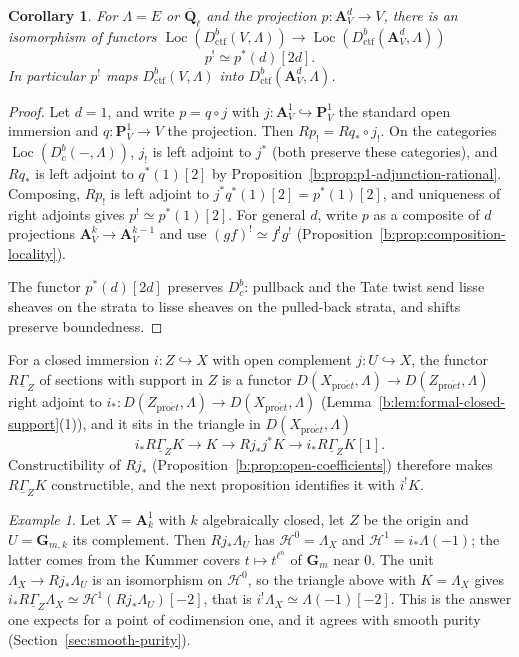 \documentclass[11pt,a4paper]{article}
\numberwithin{equation}{section}
\newtheorem{corollary}[theorem]{Corollary}
\theoremstyle{definition}
\theoremstyle{remark}
\newcommand{\Dbc}{D^b_c}
\newcommand{\Loc}{\operatorname{Loc}}
\newcommand{\Qbar}{\overline{\mathbf Q}_\ell}
\newcommand{\proet}{\mathrm{pro}\acute{e}t}
\newcommand{\Dctf}{D^b_{\mathrm{ctf}}}
\newtheorem{example}[theorem]{Example}
\begin{document}
\begin{corollary}\label{b:cor:affine-space-rational}
For $\Lambda=E$ or $\Qbar$ and the projection
$p:\mathbf A^d_V\to V$, there is an isomorphism of functors
$\Loc(\Dctf(V,\Lambda))\to\Loc(\Dctf(\mathbf A^d_V,\Lambda))$
\[
 p^!\simeq p^*(d)[2d].
\]
In particular $p^!$ maps $\Dctf(V,\Lambda)$ into
$\Dctf(\mathbf A^d_V,\Lambda)$.
\end{corollary}
\begin{proof}
Let $d=1$, and write $p=q\circ j$ with $j:\mathbf A^1_V\hookrightarrow\mathbf P^1_V$
the standard open immersion and $q:\mathbf P^1_V\to V$ the projection.
Then $Rp_!=Rq_*\circ j_!$. On the categories $\Loc(\Dbc(-,\Lambda))$,
$j_!$ is left adjoint to $j^*$ (both preserve these categories), and
$Rq_*$ is left adjoint to $q^*(1)[2]$ by
Proposition~\ref{b:prop:p1-adjunction-rational}. Composing, $Rp_!$ is left
adjoint to $j^*q^*(1)[2]=p^*(1)[2]$, and uniqueness of right adjoints
gives $p^!\simeq p^*(1)[2]$. For general $d$, write $p$ as a composite of
$d$ projections $\mathbf A^{k}_V\to\mathbf A^{k-1}_V$ and use
$(gf)^!\simeq f^!g^!$ (Proposition~\ref{b:prop:composition-locality}).

The functor $p^*(d)[2d]$ preserves $\Dbc$: pullback and the Tate twist
send lisse sheaves on the strata to lisse sheaves on the pulled-back
strata, and shifts preserve boundedness.
\end{proof}

For a closed immersion $i:Z\hookrightarrow X$ with open complement
$j:U\hookrightarrow X$, the functor $R\underline\Gamma_Z$ of sections with
support in $Z$ is a functor $D(X_{\proet},\Lambda)\to D(Z_{\proet},\Lambda)$
right adjoint to $i_*\colon D(Z_{\proet},\Lambda)\to D(X_{\proet},\Lambda)$
(Lemma~\ref{b:lem:formal-closed-support}(1)), and it sits in the triangle
in $D(X_{\proet},\Lambda)$
\[
 i_*R\underline\Gamma_ZK\longrightarrow K\longrightarrow Rj_*j^*K
 \longrightarrow i_*R\underline\Gamma_ZK[1].
\]
Constructibility of $Rj_*$ (Proposition~\ref{b:prop:open-coefficients})
therefore makes $R\underline\Gamma_ZK$ constructible, and the next proposition identifies it with $i^!K$.

\begin{example}\label{b:ex:closed-support}
Let $X=\mathbf A^1_k$ with $k$ algebraically closed, let $Z$ be the origin
and $U=\mathbf G_{m,k}$ its complement. Then $Rj_*\Lambda_U$ has
$\mathcal H^0=\Lambda_X$ and $\mathcal H^1=i_*\Lambda(-1)$; the latter
comes from the Kummer covers $t\mapsto t^{\ell^n}$ of $\mathbf G_m$ near
$0$. The unit $\Lambda_X\to Rj_*\Lambda_U$ is an isomorphism on
$\mathcal H^0$, so the triangle above with $K=\Lambda_X$ gives
$i_*R\underline\Gamma_Z\Lambda_X\simeq\mathcal H^1(Rj_*\Lambda_U)[-2]$, that is
$i^!\Lambda_X\simeq\Lambda(-1)[-2]$. This is the answer one expects for a
point of codimension one, and it agrees with smooth purity
(Section~\ref{sec:smooth-purity}).
\end{example}
\end{document}
